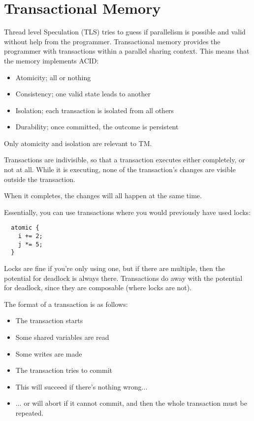 

\section{Transactional Memory}

Thread level Speculation (TLS) tries to guess if parallelism is
possible and valid without help from the programmer. Transactional
memory provides the programmer with transactions within a parallel
sharing context. This means that the memory implements ACID:

\begin{itemize}
\item Atomicity; all or nothing
\item Consistency; one valid state leads to another
\item Isolation; each transaction is isolated from all others 
\item Durability; once committed, the outcome is persistent
\end{itemize}

Only atomicity and isolation are relevant to TM.

Transactions are indivisible, so that a transaction executes either
completely, or not at all. While it is executing, none of the
transaction's changes are visible outside the transaction.

When it completes, the changes will all happen at the same time.

Essentially, you can use transactions where you would previously have
used locks:

\begin{verbatim}
  atomic {
    i += 2;
    j *= 5;
  }
\end{verbatim}

Locks are fine if you're only using one, but if there are multiple,
then the potential for deadlock is always there. Transactions do away
with the potential for deadlock, since they are composable (where
locks are not).

The format of a transaction is as follows:

\begin{itemize}
\item The transaction starts
\item Some shared variables are read
\item Some writes are made
\item The transaction tries to commit
\item This will succeed if there's nothing wrong...
\item ... or will abort if it cannot commit, and then the whole transaction must be repeated.
\end{itemize}

